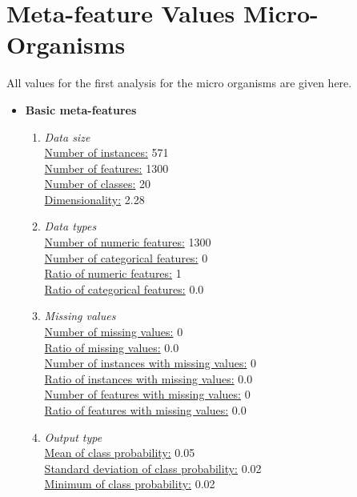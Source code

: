 \documentclass[10pt,a4paper]{report}
\begin{document}
	\section{Meta-feature Values Micro-Organisms}
	
	\label{app:MetafeatureValuesMO}
	
	All values for the first analysis for the micro organisms are given here.
	
	\begin{itemize}
		\item \textbf{Basic meta-features}\\
		\begin{enumerate}
			\item \textit{Data size} \\
			\underline{Number of instances:} 571 \\
			\underline{Number of features:} 1300 \\
			\underline{Number of classes:} 20 \\
			\underline{Dimensionality:} 2.28\\
			\item \textit{Data types} \\
			\underline{Number of numeric features:} 1300 \\
			\underline{Number of categorical features:} 0 \\
			\underline{Ratio of numeric features:} 1 \\
			\underline{Ratio of categorical features:} 0.0 \\
			\item \textit{Missing values} \\
			\underline{Number of missing values:} 0 \\
			\underline{Ratio of missing values:} 0.0 \\
			\underline{Number of instances with missing values:} 0 \\
			\underline{Ratio of instances with missing values:} 0.0 \\
			\underline{Number of features with missing values:} 0 \\
			\underline{Ratio of features with missing values:} 0.0 \\
			\item \textit{Output type} \\
			\underline{Mean of class probability:} 0.05 \\
			\underline{Standard deviation of class probability:} 0.02 \\
			\underline{Minimum of class probability:} 0.02 \\

\end{enumerate}
\end{itemize}
\end{document}
